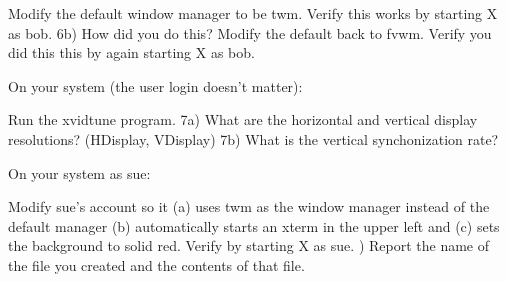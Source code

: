 Modify the default window manager to be {\ltt{}twm}.
\hfill\break
Verify this works by starting X as {\ltt{}bob}.
\hfill\break
6b) How did you do this?
\hfill\break
Modify the default back to {\ltt{}fvwm}.
\hfill\break
Verify you did this this by again starting X as {\ltt{}bob}.

On your system (the user login doesn't matter):

Run the {\ltt{}xvidtune} program.
\hfill\break
7a) What are the horizontal and vertical display resolutions?
({\ltt{}HDisplay}, {\ltt{}VDisplay})
\hfill\break
7b) What is the vertical synchonization rate?


On your system as {\ltt{}sue}:

Modify sue's account so it
(a) uses {\ltt{}twm} as the window manager instead of the default manager
(b) automatically starts an xterm in the upper left
and
(c) sets the background to solid red.
\hfill\break
Verify by starting X as {\ltt{}sue}.
\hfill{}) Report the name of the file you created and the contents of
that file.

\bye
